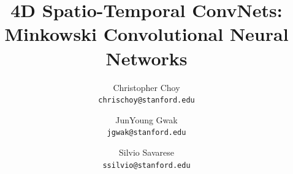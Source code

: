 \documentclass[10pt,twocolumn,letterpaper]{article}
\begin{document}
\title{4D Spatio-Temporal ConvNets: Minkowski Convolutional Neural Networks}

%

\author{
  Christopher Choy \\
  \small{\texttt{chrischoy@stanford.edu}}
   \and
   JunYoung Gwak \\
   \small{\texttt{jgwak@stanford.edu}}
   \and
   Silvio Savarese \\
   \small{\texttt{ssilvio@stanford.edu}}
}

\maketitle
\end{document}
